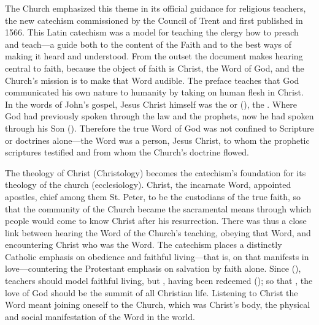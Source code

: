 The Church emphasized this theme in its official guidance for religious
teachers, the new catechism  commissioned by the
Council of Trent and first published in 1566.%
    \Autocites
    {Catholic:Catechismus1614}
    []{NewCatholic}
This Latin catechism was a model for teaching the clergy how to preach and
teach---a guide both to the content of the Faith and to the best ways of making
it heard and understood.%
    \Autocite[]{NewCatholic}
From the outset the document makes hearing central to faith, because the object
of faith is Christ, the Word of God, and the Church's mission is to make that
Word audible.
The preface teaches that God communicated his own nature to humanity by taking
on human flesh in Christ.
In the words of John's gospel, Jesus Christ himself was the  or
 (), the .
Where God had previously spoken through the law and the prophets, now he had
spoken through his Son ().
Therefore the true Word of God was not confined to Scripture or doctrines
alone---the Word was a person, Jesus Christ, to whom the prophetic scriptures
testified and from whom the Church's doctrine flowed.%
    \Autocite[9]{Catholic:Catechismus1614}


The theology of Christ (Christology) becomes the catechism's foundation for its
theology of the church (ecclesiology).
Christ, the incarnate Word, appointed apostles, chief among them St. Peter, to
be the custodians of the true faith, so that the community of the Church became 
the sacramental means through which people would come to know Christ after his
resurrection.
There was thus a close link between hearing the Word of the Church's teaching,
obeying that Word, and encountering Christ who was the Word.
The catechism places a distinctly Catholic emphasis on obedience and faithful
living---that is, on  that manifests in love---countering
the Protestant emphasis on salvation by faith alone.
Since 
(), teachers should model faithful living,  but , having been redeemed 
(); so that , the love of God should be the summit of all Christian
life.%
    \Autocite[6--7]{Catholic:Catechismus1614}
Listening to Christ the Word meant joining oneself to the Church, which was
Christ's body, the physical and social manifestation of the Word in the world.


